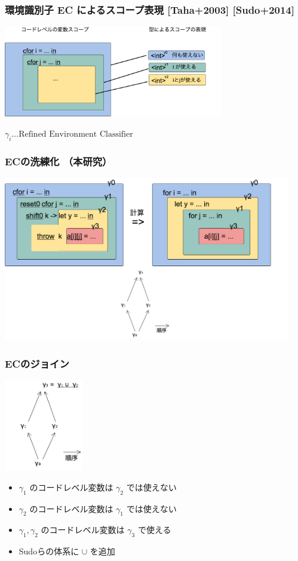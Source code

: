 \documentclass[dvipdfmx,cjk,xcolor=dvipsnames,envcountsect,notheorems,12pt]{beamer}
\theoremstyle{definition}
\begin{document}
\begin{frame}
  \frametitle{環境識別子 EC によるスコープ表現 [Taha+2003] [Sudo+2014]}
  \begin{center}
    \includegraphics[clip,height=4cm]{../img/ec.png}
  \end{center}
  $\gamma_i ... \text{Refined Environment Classifier}$
\end{frame}

\begin{frame}
  \frametitle{ECの洗練化 （本研究）}
  \center
  \includegraphics[clip,height=7.2cm]{../img/ecex.png}
\end{frame}

\begin{frame}
  \frametitle{ECのジョイン}
  \center
  \includegraphics[clip,height=4cm]{../img/ecgraph.png}
  \begin{itemize}
  \item<2-> $\gamma_1$ のコードレベル変数は $\gamma_2$ では使えない
  \item<3-> $\gamma_2$ のコードレベル変数は $\gamma_1$ では使えない
  \item<4-> $\gamma_1, \gamma_2$ のコードレベル変数は $\gamma_3$ で使える
  \item<5->[$\Rightarrow$] Sudoらの体系に $\cup$ を追加
  \end{itemize}
\end{frame}
\end{document}
